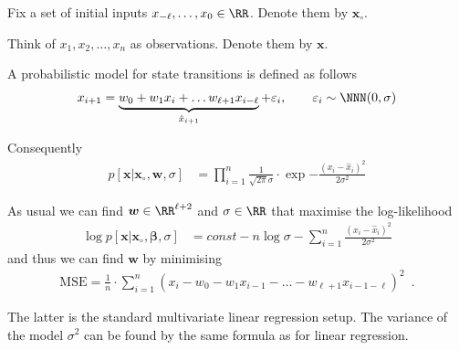 \documentclass[landscape,footrule]{foils}
\renewcommand{\vec}[1]{\boldsymbol{#1}}
\begin{document}
\begin{triangles}
\item Fix a set of initial inputs $x_{-\ell}, \ldots, x_{0}\in \RR$. Denote them by $\vec{x}_\circ$. 
\item Think of $x_{1},x_{2},\ldots, x_n$ as observations. Denote them by $\vec{x}$.  
\item A probabilistic model for state transitions is defined as follows
\begin{align*}
  x_{i+1}=\underbrace{w_0 +w_1x_i+\ldots w_{\ell+1} x_{i-\ell}}_{\hat{x}_{i+1}}+\varepsilon_i,\qquad \varepsilon_i\sim\NNN(0,\sigma)
\end{align*}
\item Consequently 
\begin{align*}
 p[\vec{x}|\vec{x}_\circ,\vec{w},\sigma]&=\prod_{i=1}^n\frac{1}{\sqrt{2\pi}
    \sigma}\cdot\exp{-\frac{(x_i-\hat{x}_i)^2}{2\sigma^2}}
\end{align*}
\end{triangles}



As usual we can find  $\vec{w}\in \RR^{\ell+2}$ and $\sigma\in\RR$ that maximise the log-likelihood
\begin{align*}
\log p[\vec{x}|\vec{x}_\circ,\vec{\beta},\sigma]&= const -n\log \sigma-\sum_{i=1}^n\frac{(x_i-\hat{x}_i)^2}{2\sigma^2}
\end{align*}
and thus we can find $\vec{w}$ by minimising 
\begin{align*}
\text{MSE}=\frac{1}{n}\cdot \sum_{i=1}^n(x_i-w_0-w_1x_{i-1}-\ldots- w_{\ell+1} x_{i-1-\ell})^2\enspace.
\end{align*}

The latter is the standard multivariate linear regression setup. The variance of the model $\sigma^2$ can be found by the same formula as for linear regression.
 

\end{document}

